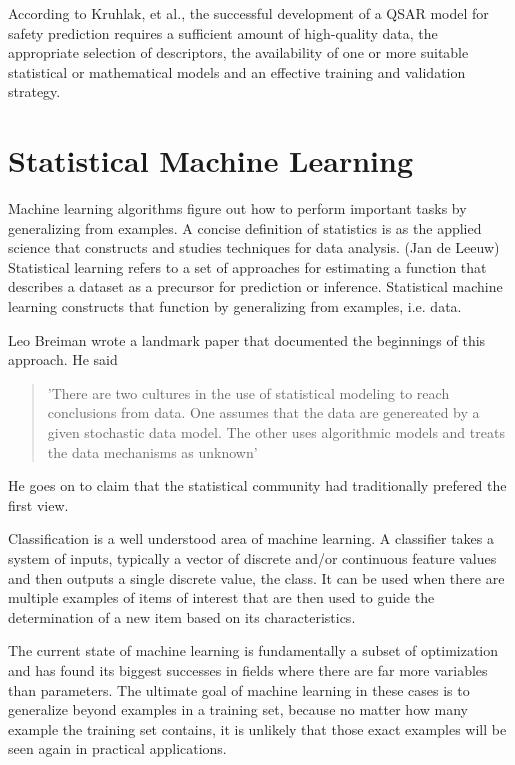 According to Kruhlak, et al., the successful development of a QSAR model for safety prediction requires a sufficient amount of high-quality data, the appropriate selection of descriptors, the availability of one or more suitable statistical or mathematical models and an effective training and validation strategy.
\cite{Kruhlak2012}

\section{Statistical Machine Learning}

Machine learning algorithms figure out how to perform important tasks by generalizing from examples. A concise definition of statistics is as the applied science that constructs and studies techniques for data analysis. (Jan de Leeuw) Statistical learning refers to a set of approaches for estimating a function that describes a dataset as a precursor for prediction or inference. \cite{James2013} Statistical machine learning constructs that function by generalizing from examples, i.e. data.

Leo Breiman wrote a landmark paper that documented the beginnings of this approach. He said 
\begin{quote}
'There are two cultures in the use of statistical modeling to reach conclusions from data. One assumes that the data are genereated by a given stochastic data model. The other uses algorithmic models and treats the data mechanisms as unknown' \cite{Breiman2001}
\end{quote} He goes on to claim that the statistical community had traditionally prefered the first view.

Classification is a well understood area of machine learning. A classifier takes a system of inputs, typically a vector of discrete and/or continuous feature values and then outputs a single discrete value, the class. \cite{Domingos2012} It can be used when there are multiple examples of items of interest that are then used to guide the determination of a new item based on its characteristics.

The current state of machine learning is fundamentally a subset of optimization and has found its biggest successes in fields where there are far more variables than parameters. The ultimate goal of machine learning in these cases is to generalize beyond examples in a training set, because no matter how many example the training set contains, it is unlikely that those exact examples will be seen again in practical applications. \cite{Domingos2012} 

